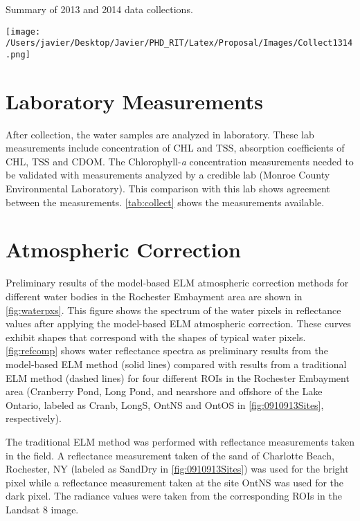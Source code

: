 \begin{table}[htb]
  \caption{Summary of 2013 and 2014 data collections.}
  \centering
  \texttt{[image: /Users/javier/Desktop/Javier/PHD\_RIT/Latex/Proposal/Images/Collect1314.png]}
  \label{tab:collect}
\end{table}

\section{Laboratory Measurements}

After collection, the water samples are analyzed in laboratory. These lab measurements include concentration of CHL and TSS, absorption coefficients of CHL, TSS and CDOM. The Chlorophyll-{\it a} concentration measurements needed to be validated with measurements analyzed by a credible lab (Monroe County Environmental Laboratory). This comparison with this lab shows agreement between the measurements. \autoref{tab:collect} shows the measurements available. 

\section{Atmospheric Correction}

Preliminary results of the model-based ELM atmospheric correction methods for different water bodies in the Rochester Embayment area are shown in \autoref{fig:waterpxs}. This figure shows the spectrum of the water pixels in reflectance values after applying the model-based ELM atmospheric correction. These curves exhibit shapes that correspond with the shapes of typical water pixels. \autoref{fig:refcomp} shows water reflectance spectra as preliminary results from the model-based ELM method (solid lines) compared with results from a traditional ELM method (dashed lines) for four different ROIs in the Rochester Embayment area (Cranberry Pond, Long Pond, and nearshore and offshore of the Lake Ontario, labeled as Cranb, LongS, OntNS and OntOS in \autoref{fig:0910913Sites}, respectively). 

The traditional ELM method was performed with reflectance measurements taken in the field. A reflectance measurement taken of the sand of Charlotte Beach, Rochester, NY (labeled as SandDry in \autoref{fig:0910913Sites}) was used for the bright pixel while a reflectance measurement taken at the site OntNS was used for the dark pixel. The radiance values were taken from the corresponding ROIs in the Landsat 8 image. 

